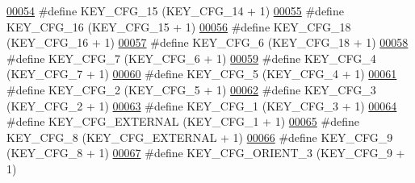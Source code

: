 \begin{DoxyCode}
\hypertarget{dmp_key_8h_source.tex_l00054}{}\hyperlink{dmp_key_8h_a0435046e662150820a0cc24da587f7d5}{00054} \textcolor{preprocessor}{#define KEY\_CFG\_15                  (KEY\_CFG\_14 + 1)}
\hypertarget{dmp_key_8h_source.tex_l00055}{}\hyperlink{dmp_key_8h_a19880a4f37b85adf9dfaa7eccbd183ae}{00055} \textcolor{preprocessor}{#define KEY\_CFG\_16                  (KEY\_CFG\_15 + 1)}
\hypertarget{dmp_key_8h_source.tex_l00056}{}\hyperlink{dmp_key_8h_a55f22b6e47ca024decdb65c3dab95a50}{00056} \textcolor{preprocessor}{#define KEY\_CFG\_18                  (KEY\_CFG\_16 + 1)}
\hypertarget{dmp_key_8h_source.tex_l00057}{}\hyperlink{dmp_key_8h_ab8203becdd3b2ab7511ecb5ca5a7a69c}{00057} \textcolor{preprocessor}{#define KEY\_CFG\_6                   (KEY\_CFG\_18 + 1)}
\hypertarget{dmp_key_8h_source.tex_l00058}{}\hyperlink{dmp_key_8h_af8570555f78a4e1d73520be090f23d9a}{00058} \textcolor{preprocessor}{#define KEY\_CFG\_7                   (KEY\_CFG\_6 + 1)}
\hypertarget{dmp_key_8h_source.tex_l00059}{}\hyperlink{dmp_key_8h_a91802491b6da4684594ec8f3a6c21f4f}{00059} \textcolor{preprocessor}{#define KEY\_CFG\_4                   (KEY\_CFG\_7 + 1)}
\hypertarget{dmp_key_8h_source.tex_l00060}{}\hyperlink{dmp_key_8h_ab7bac070f097a941d52987f17958c2be}{00060} \textcolor{preprocessor}{#define KEY\_CFG\_5                   (KEY\_CFG\_4 + 1)}
\hypertarget{dmp_key_8h_source.tex_l00061}{}\hyperlink{dmp_key_8h_ae61b4f19fcf032540a6494e5625da38a}{00061} \textcolor{preprocessor}{#define KEY\_CFG\_2                   (KEY\_CFG\_5 + 1)}
\hypertarget{dmp_key_8h_source.tex_l00062}{}\hyperlink{dmp_key_8h_a981bb2252129c3032a380f819cee0672}{00062} \textcolor{preprocessor}{#define KEY\_CFG\_3                   (KEY\_CFG\_2 + 1)}
\hypertarget{dmp_key_8h_source.tex_l00063}{}\hyperlink{dmp_key_8h_a4288b8fd9061526e1c67b7769258227a}{00063} \textcolor{preprocessor}{#define KEY\_CFG\_1                   (KEY\_CFG\_3 + 1)}
\hypertarget{dmp_key_8h_source.tex_l00064}{}\hyperlink{dmp_key_8h_a63349c3281878c9812df9b8c50ce0e14}{00064} \textcolor{preprocessor}{#define KEY\_CFG\_EXTERNAL            (KEY\_CFG\_1 + 1)}
\hypertarget{dmp_key_8h_source.tex_l00065}{}\hyperlink{dmp_key_8h_a3692f6ad2f88c915a9fc393f6dd46a7c}{00065} \textcolor{preprocessor}{#define KEY\_CFG\_8                   (KEY\_CFG\_EXTERNAL + 1)}
\hypertarget{dmp_key_8h_source.tex_l00066}{}\hyperlink{dmp_key_8h_a1eefc8eff407aef7783647dd936d9bfa}{00066} \textcolor{preprocessor}{#define KEY\_CFG\_9                   (KEY\_CFG\_8 + 1)}
\hypertarget{dmp_key_8h_source.tex_l00067}{}\hyperlink{dmp_key_8h_a4c2f4e94cf149b7e4d74bd531e33f363}{00067} \textcolor{preprocessor}{#define KEY\_CFG\_ORIENT\_3            (KEY\_CFG\_9 + 1)}

\end{DoxyCode}
